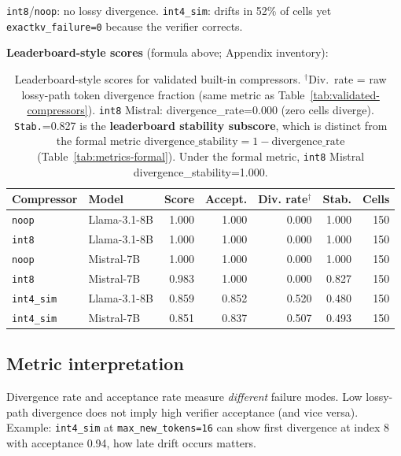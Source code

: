 \documentclass[11pt]{article}
\begin{document}
\texttt{int8}/\texttt{noop}: no lossy divergence. \texttt{int4\_sim}: drifts in
52\% of cells yet \texttt{exactkv\_failure=0} because the verifier corrects.

\textbf{Leaderboard-style scores} (formula above; Appendix inventory):

\begin{table}[htbp]
\centering\small
\begin{tabular}{l l r r r r r}
\toprule
\textbf{Compressor} & \textbf{Model} & \textbf{Score} & \textbf{Accept.} & \textbf{Div. rate$^\dagger$} & \textbf{Stab.} & \textbf{Cells} \\ \midrule
\texttt{noop} & Llama-3.1-8B & 1.000 & 1.000 & 0.000 & 1.000 & 150 \\
\texttt{int8} & Llama-3.1-8B & 1.000 & 1.000 & 0.000 & 1.000 & 150 \\
\texttt{noop} & Mistral-7B & 1.000 & 1.000 & 0.000 & 1.000 & 150 \\
\texttt{int8} & Mistral-7B & 0.983 & 1.000 & 0.000 & 0.827 & 150 \\
\texttt{int4\_sim} & Llama-3.1-8B & 0.859 & 0.852 & 0.520 & 0.480 & 150 \\
\texttt{int4\_sim} & Mistral-7B & 0.851 & 0.837 & 0.507 & 0.493 & 150 \\
\bottomrule
\end{tabular}
\caption{Leaderboard-style scores for validated built-in compressors.
$^\dagger$Div.\ rate = raw lossy-path token divergence fraction (same metric as Table~\ref{tab:validated-compressors}).
\texttt{int8} Mistral: divergence\_rate=0.000 (zero cells diverge). \texttt{Stab.}=0.827
is the \textbf{leaderboard stability subscore}, which
is distinct from the formal metric $\text{divergence\_stability} = 1 - \text{divergence\_rate}$
(Table~\ref{tab:metrics-formal}). Under the formal metric, \texttt{int8} Mistral
divergence\_stability=1.000.}
\label{tab:leaderboard-scores}
\end{table}

\subsection{Metric interpretation}
\begin{sloppypar}
Divergence rate and acceptance rate measure \emph{different} failure modes. Low
lossy-path divergence does not imply high verifier acceptance (and vice versa).
Example: \texttt{int4\_sim} at \texttt{max\_new\_tokens=16} can show first
divergence at index 8 with acceptance 0.94, how late drift occurs matters.
\end{sloppypar}
\end{document}
